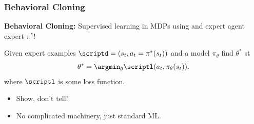 
\begin{frame}
	\frametitle{Behavioral Cloning}
	\begin{center}
		\textbf{Behavioral Cloning:} Supervised learning in MDPs using and expert agent expert $\pi^*$!
	\end{center}
	Given expert examples $\scriptd = (s_t, a_t = \pi^*(s_t))$ and a model $\pi_\theta$ find $\theta^*$ st
	\begin{equation*}
		\theta^*  = \argmin_\theta \scriptl(a_t, \pi_\theta(s_t)).
	\end{equation*}
	where $\scriptl$ is some loss function.
	\begin{itemize}
		\item  Show, don't tell! 
		\item No complicated machinery, just standard ML.
	\end{itemize}
\end{frame}


